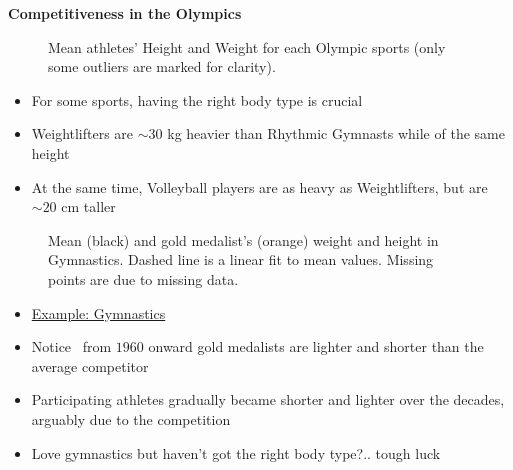 \documentclass[11pt, a4paper]{report}
\newcommand\inputpgf[2]{{
\let\pgfimageWithoutPath\pgfimage
\renewcommand{\pgfimage}[2][]{\pgfimageWithoutPath[##1]{#1/##2}}

}} %
\newcommand{\pathnPlan}{/home/vadim/Documents/nplan_olympics/story/}
\newcommand{\pathFigs}{figs} %
\begin{document}
\pagestyle{empty}

\begin{landscape}
\centerline{\LARGE\textbf{Competitiveness in the Olympics}}
\end{landscape}

\begin{landscape}
\begin{figure}[!htbp]
	\centering
	\inputpgf{\pathnPlan \pathFigs}{HW_scatter.pgf}
	\caption{Mean athletes' Height and Weight for each Olympic sports (only some outliers are marked for clarity).}
\end{figure}
\begin{itemize}
\item For some sports, having the right body type is crucial
\item Weightlifters are $\sim30$ kg heavier than Rhythmic Gymnasts while of the same height
\item At the same time, Volleyball players are as heavy as Weightlifters, but are $\sim20$ cm taller
\end{itemize}
\end{landscape}

\begin{landscape}
\begin{figure}[!htbp]
	\centering
	\inputpgf{\pathnPlan \pathFigs}{GymnasticsYearly.pgf}
	\caption{Mean (black) and gold medalist's (orange) weight and height in Gymnastics. Dashed line is a linear fit to mean values. Missing points are due to missing data.}
\end{figure}
\begin{itemize}
\item \underline{Example: Gymnastics}
\item Notice \textendash\ from $1960$ onward gold medalists are lighter and shorter than the average competitor
\item Participating athletes gradually became shorter and lighter over the decades, arguably due to the competition
\item Love gymnastics but haven't got the right body type?.. tough luck
\end{itemize}
\end{landscape}
\end{document}

